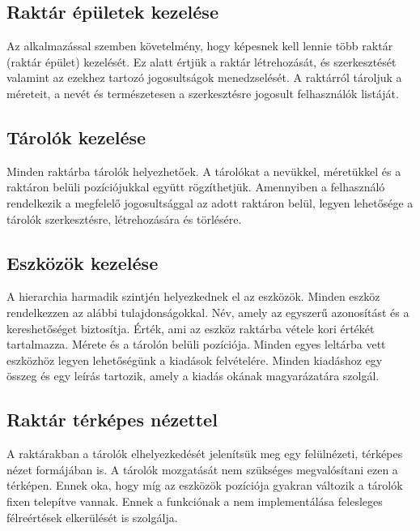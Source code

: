 \subsection{Raktár épületek kezelése}
Az alkalmazással szemben követelmény, hogy képesnek kell lennie több raktár (raktár épület) kezelését.
Ez alatt értjük a raktár létrehozását, és szerkesztését valamint az ezekhez tartozó jogosultságok menedzselését.
A raktárról tároljuk a méreteit, a nevét és természetesen a szerkesztésre jogosult felhasználók listáját.

\subsection{Tárolók kezelése}
Minden raktárba tárolók helyezhetőek. A tárolókat a nevükkel, méretükkel és a raktáron belüli pozíciójukkal együtt rögzíthetjük.
Amennyiben a felhasználó rendelkezik a megfelelő jogosultsággal az adott raktáron belül, legyen lehetősége a tárolók szerkesztésre, létrehozására és törlésére.

\subsection{Eszközök kezelése}
A hierarchia harmadik szintjén helyezkednek el az eszközök. 
Minden eszköz rendelkezzen az alábbi tulajdonságokkal.
Név, amely az egyszerű azonosítást és a kereshetőséget biztosítja.
Érték, ami az eszköz raktárba vétele kori értékét tartalmazza.
Mérete és a tárolón belüli pozíciója. 
Minden egyes leltárba vett eszközhöz legyen lehetőségünk a kiadások felvételére.
Minden kiadáshoz egy összeg és egy leírás tartozik, amely a kiadás okának magyarázatára szolgál.

\subsection{Raktár térképes nézettel}
A raktárakban a tárolók elhelyezkedését jelenítsük meg egy felülnézeti, térképes nézet formájában is.
A tárolók mozgatását nem szükséges megvalósítani ezen a térképen.
Ennek oka, hogy míg az eszközök pozíciója gyakran változik a tárolók fixen telepítve vannak.
Ennek a funkciónak a nem implementálása felesleges félreértések elkerülését is szolgálja.

